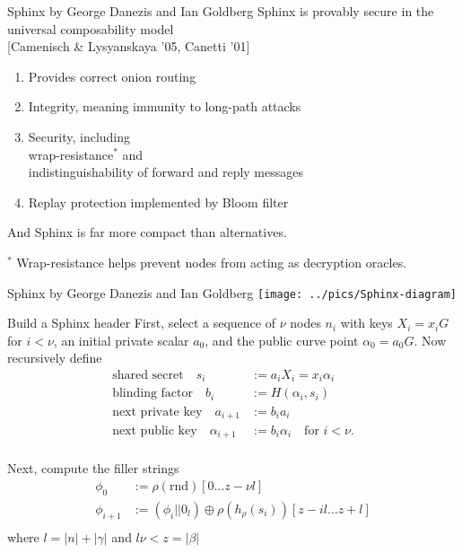 \documentclass[fleqn,xcolor={usenames,dvipsnames}]{beamer}
\begin{document}
\begin{frame}{Sphinx by George Danezis and Ian Goldberg}
Sphinx is provably secure in the universal composability model \\
\hspace*{2pt} [Camenisch \& Lysyanskaya '05, Canetti '01]
\begin{enumerate}
\item Provides correct onion routing
\item Integrity, meaning immunity to long-path attacks
\item Security, including \\
\hspace*{2pt} wrap-resistance{\small $^*$} and \\
\hspace*{2pt} indistinguishability of forward and reply messages
\item[] Replay protection implemented by Bloom filter
\end{enumerate}

\bigskip

And Sphinx is far more compact than alternatives.


\bigskip

{\small $^*$ Wrap-resistance helps prevent nodes from acting as decryption oracles.}
\end{frame}


\begin{frame}{Sphinx by George Danezis and Ian Goldberg}
\texttt{[image: ../pics/Sphinx-diagram]}
\end{frame}

\def\mathcomma{}

\begin{frame}{Build a Sphinx header}
First, select a sequence of $\nu$ nodes $n_i$ with keys $X_i = x_i G$ for $i<\nu$,
 an initial private scalar $a_0$, and
 the public curve point $\alpha_0 = a_0 G$.
Now recursively define 
\[ \begin{aligned}
\textrm{shared secret}\quad
 s_i &:= a_i X_i = x_i \alpha_i \mathcomma \\
\textrm{blinding factor}\quad
 b_i &:= H(\alpha_i,s_i) \mathcomma \\
\textrm{next private key}\quad
 a_{i+1} &:= b_i a_i \mathcomma \\ %
\textrm{next public key}\quad
 \alpha_{i+1} &:= b_i \alpha_i \quad\textrm{for $i < \nu$.} \\
\end{aligned} \]

Next, compute the filler strings
\[ \begin{aligned}
 \phi_0 &:= \rho(\textrm{rnd})[0 \ldots z - \nu l] \\
 \phi_{i+1} &:= (\phi_i || 0_l) \oplus \rho(h_\rho(s_i))[ z-il \ldots z+l ] \\
\end{aligned} \]
where $l = |n| + |\gamma|$ and $l \nu < z = |\beta|$

\end{frame}
\end{document}
